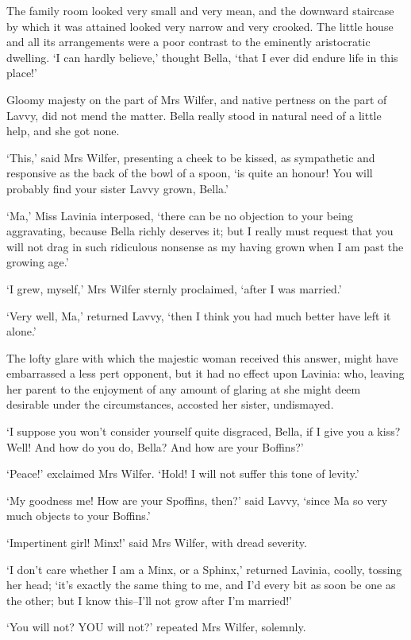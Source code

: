 The family room looked very small and very mean, and the downward
staircase by which it was attained looked very narrow and very crooked.
The little house and all its arrangements were a poor contrast to the
eminently aristocratic dwelling. ‘I can hardly believe,’ thought Bella,
‘that I ever did endure life in this place!’

Gloomy majesty on the part of Mrs Wilfer, and native pertness on the
part of Lavvy, did not mend the matter. Bella really stood in natural
need of a little help, and she got none.

‘This,’ said Mrs Wilfer, presenting a cheek to be kissed, as sympathetic
and responsive as the back of the bowl of a spoon, ‘is quite an honour!
You will probably find your sister Lavvy grown, Bella.’

‘Ma,’ Miss Lavinia interposed, ‘there can be no objection to your being
aggravating, because Bella richly deserves it; but I really must request
that you will not drag in such ridiculous nonsense as my having grown
when I am past the growing age.’

‘I grew, myself,’ Mrs Wilfer sternly proclaimed, ‘after I was married.’

‘Very well, Ma,’ returned Lavvy, ‘then I think you had much better have
left it alone.’

The lofty glare with which the majestic woman received this answer,
might have embarrassed a less pert opponent, but it had no effect upon
Lavinia: who, leaving her parent to the enjoyment of any amount of
glaring at she might deem desirable under the circumstances, accosted
her sister, undismayed.

‘I suppose you won’t consider yourself quite disgraced, Bella, if I give
you a kiss? Well! And how do you do, Bella? And how are your Boffins?’

‘Peace!’ exclaimed Mrs Wilfer. ‘Hold! I will not suffer this tone of
levity.’

‘My goodness me! How are your Spoffins, then?’ said Lavvy, ‘since Ma so
very much objects to your Boffins.’

‘Impertinent girl! Minx!’ said Mrs Wilfer, with dread severity.

‘I don’t care whether I am a Minx, or a Sphinx,’ returned Lavinia,
coolly, tossing her head; ‘it’s exactly the same thing to me, and I’d
every bit as soon be one as the other; but I know this--I’ll not grow
after I’m married!’

‘You will not? YOU will not?’ repeated Mrs Wilfer, solemnly.

